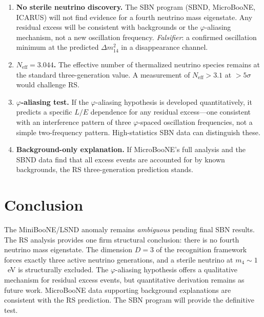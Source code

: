 \documentclass[12pt,a4paper]{article}
\theoremstyle{definition}
\theoremstyle{remark}
\begin{document}
\begin{enumerate}
  \item \textbf{No sterile neutrino discovery.}  The SBN program
  (SBND, MicroBooNE, ICARUS) will not find evidence for a
  fourth neutrino mass eigenstate.  Any residual excess will be
  consistent with backgrounds or the $\varphi$-aliasing mechanism,
  not a new oscillation frequency.  \emph{Falsifier}: a confirmed
  oscillation minimum at the predicted $\Delta m^2_{14}$ in a
  disappearance channel.

  \item \textbf{$N_{\mathrm{eff}} = 3.044$.}  The effective number of
  thermalized neutrino species remains at the standard three-generation
  value.  A measurement of $N_{\mathrm{eff}} > 3.1$ at $>5\sigma$
  would challenge RS.

  \item \textbf{$\varphi$-aliasing test.}  If the $\varphi$-aliasing
  hypothesis is developed quantitatively, it predicts a specific $L/E$
  dependence for any residual excess---one consistent with an
  interference pattern of three $\varphi$-spaced oscillation
  frequencies, not a simple two-frequency pattern.  High-statistics SBN
  data can distinguish these.

  \item \textbf{Background-only explanation.}  If MicroBooNE's full
  analysis and the SBND data find that all excess events are accounted
  for by known backgrounds, the RS three-generation prediction stands.
\end{enumerate}

\section{Conclusion}
\label{sec:conclusion}

The MiniBooNE/LSND anomaly remains \emph{ambiguous} pending final SBN
results.  The RS analysis provides one firm structural conclusion: there
is no fourth neutrino mass eigenstate.  The dimension $D = 3$ of the
recognition framework forces exactly three active neutrino generations,
and a sterile neutrino at $m_4 \sim 1$~eV is structurally excluded.
The $\varphi$-aliasing hypothesis offers a qualitative mechanism for
residual excess events, but quantitative derivation remains as future
work.  MicroBooNE data supporting background explanations are consistent
with the RS prediction.  The SBN program will provide the definitive
test.
\end{document}
